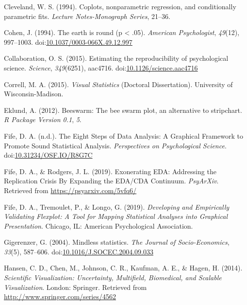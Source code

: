 \documentclass[
  man]{apa6}
\begin{document}
\leavevmode\hypertarget{ref-Cleveland1994}{}%
Cleveland, W. S. (1994). Coplots, nonparametric regression, and conditionally parametric fits. \emph{Lecture Notes-Monograph Series}, 21--36.

\leavevmode\hypertarget{ref-cohen_earth_1994}{}%
Cohen, J. (1994). The earth is round (p \textless{} .05). \emph{American Psychologist}, \emph{49}(12), 997--1003. doi:\href{https://doi.org/10.1037/0003-066X.49.12.997}{10.1037/0003-066X.49.12.997}

\leavevmode\hypertarget{ref-open_science_collaboration_estimating_2015}{}%
Collaboration, O. S. (2015). Estimating the reproducibility of psychological science. \emph{Science}, \emph{349}(6251), aac4716. doi:\href{https://doi.org/10.1126/science.aac4716}{10.1126/science.aac4716}

\leavevmode\hypertarget{ref-Correll2015}{}%
Correll, M. A. (2015). \emph{Visual Statistics} (Doctoral Dissertation). University of Wisconsin-Madison.

\leavevmode\hypertarget{ref-eklund2012beeswarm}{}%
Eklund, A. (2012). Beeswarm: The bee swarm plot, an alternative to stripchart. \emph{R Package Version 0.1}, \emph{5}.

\leavevmode\hypertarget{ref-Fife2019e}{}%
Fife, D. A. (n.d.). The Eight Steps of Data Analysis: A Graphical Framework to Promote Sound Statistical Analysis. \emph{Perspectives on Psychological Science}. doi:\href{https://doi.org/10.31234/OSF.IO/R8G7C}{10.31234/OSF.IO/R8G7C}

\leavevmode\hypertarget{ref-Fife2019a}{}%
Fife, D. A., \& Rodgers, J. L. (2019). Exonerating EDA: Addressing the Replication Crisis By Expanding the EDA/CDA Continuum. \emph{PsyArXiv}. Retrieved from \url{https://psyarxiv.com/5vfq6/}

\leavevmode\hypertarget{ref-Fife2019d}{}%
Fife, D. A., Tremoulet, P., \& Longo, G. (2019). \emph{Developing and Empirically Validating Flexplot: A Tool for Mapping Statistical Analyses into Graphical Presentation}. Chicago, IL: American Psychological Association.

\leavevmode\hypertarget{ref-Gigerenzer2004}{}%
Gigerenzer, G. (2004). Mindless statistics. \emph{The Journal of Socio-Economics}, \emph{33}(5), 587--606. doi:\href{https://doi.org/10.1016/J.SOCEC.2004.09.033}{10.1016/J.SOCEC.2004.09.033}

\leavevmode\hypertarget{ref-Hansen}{}%
Hansen, C. D., Chen, M., Johnson, C. R., Kaufman, A. E., \& Hagen, H. (2014). \emph{Scientific Visualization: Uncertainty, Multifield, Biomedical, and Scalable Visualization}. London: Springer. Retrieved from \url{http://www.springer.com/series/4562}
\end{document}
